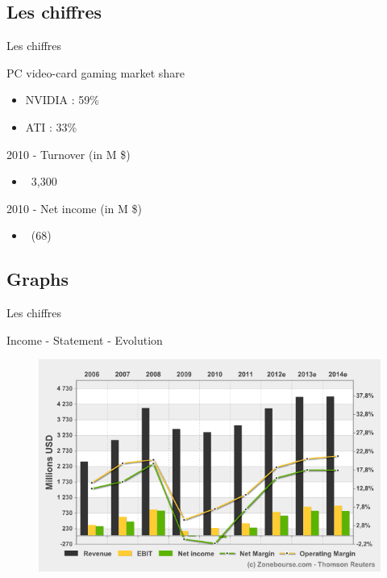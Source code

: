 \documentclass{beamer}
\begin{document}
\subsection{Les chiffres}
\begin{frame}{Les chiffres}
	\transdissolve[duration=0.1] %
	\begin{block}{PC video-card gaming market share}
		\begin{itemize}
			\item<+->{NVIDIA : 59\% }
			\item<+->{ATI : 33\% }
		\end{itemize}
	\end{block}	
	\begin{block}{2010 - Turnover (in M \$)}
		\begin{itemize}
			\item<+->{~3,300}
		\end{itemize}
	\end{block}
	\begin{block}{2010 - Net income (in M \$)}
		\begin{itemize}
			\item<+->{~(68)}
		\end{itemize}
	\end{block}
\end{frame}

\subsection{Graphs}
\begin{frame}{Les chiffres}
	\begin{block}{Income - Statement - Evolution}
		\begin{figure}[h]
			\includegraphics[width=1.15\textheight]{./Income_Statement_Evolution.png}
		\end{figure}
	\end{block}	
\end{frame}
\end{document}
